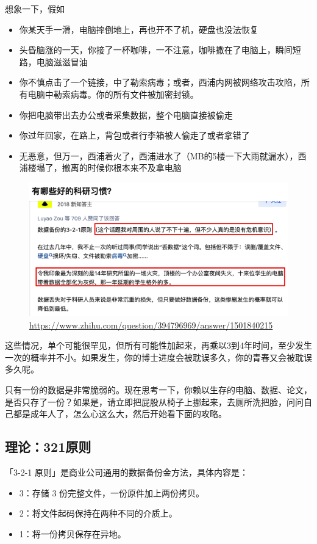 想象一下，假如
\begin{itemize}
    \item 你某天手一滑，电脑摔倒地上，再也开不了机，硬盘也没法恢复
    \item 头昏脑涨的一天，你接了一杯咖啡，一不注意，咖啡撒在了电脑上，瞬间短路，电脑滋滋冒油
    \item 你不慎点击了一个链接，中了勒索病毒；或者，西浦内网被网络攻击攻陷，所有电脑中勒索病毒。你的所有文件被加密封锁。
    \item 你把电脑带出去办公或者采集数据，整个电脑直接被偷走
    \item 你过年回家，在路上，背包或者行李箱被人偷走了或者拿错了
    \item 无恶意，但万一，西浦着火了，西浦进水了（MB的5楼一下大雨就漏水），西浦楼塌了，撤离的时候你根本来不及拿电脑
\end{itemize}


\begin{figure}[H]
    \centering
    \includegraphics[width=0.8\columnwidth]{author-folder/Kai.Wu/backup_zhihu.png}
    \caption{\url{https://www.zhihu.com/question/394796969/answer/1501840215}}
\end{figure}

这些情况，单个可能很罕见，但所有可能性加起来，再乘以3到4年时间，至少发生一次的概率并不小。如果发生，你的博士进度会被耽误多久，你的青春又会被耽误多久呢。

只有一份的数据是非常脆弱的。现在思考一下，你赖以生存的电脑、数据、论文，是否只存了一份？如果是，请立即把屁股从椅子上挪起来，去厕所洗把脸，问问自己都是成年人了，怎么心这么大，然后开始看下面的攻略。

\subsection{理论：321原则}

「3-2-1 原则」是商业公司通用的数据备份金方法，具体内容是：
\begin{itemize}
    \item 3：存储 3 份完整文件，一份原件加上两份拷贝。
    \item 2：将文件起码保持在两种不同的介质上。
    \item 1：将一份拷贝保存在异地。
\end{itemize}

